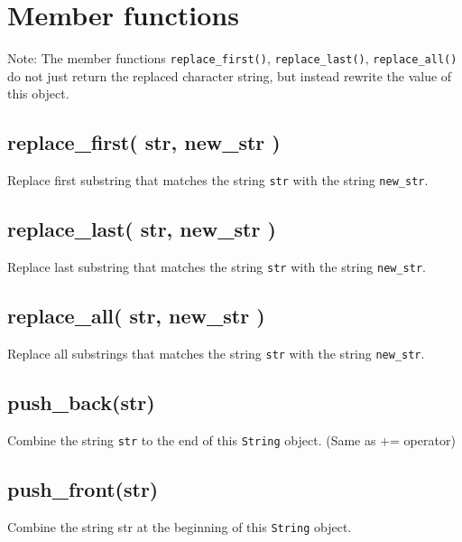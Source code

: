 \documentclass[
]{book}
\begin{document}
\hypertarget{member-functions}{%
\section{Member functions}\label{member-functions}}

Note: The member functions \texttt{replace\_first()}, \texttt{replace\_last()}, \texttt{replace\_all()} do not just return the replaced character string, but instead rewrite the value of this object.

\hypertarget{replace_first-str-new_str}{%
\subsection{replace\_first( str, new\_str )}\label{replace_first-str-new_str}}

Replace first substring that matches the string \texttt{str} with the string \texttt{new\_str}.

\hypertarget{replace_last-str-new_str}{%
\subsection{replace\_last( str, new\_str )}\label{replace_last-str-new_str}}

Replace last substring that matches the string \texttt{str} with the string \texttt{new\_str}.

\hypertarget{replace_all-str-new_str}{%
\subsection{replace\_all( str, new\_str )}\label{replace_all-str-new_str}}

Replace all substrings that matches the string \texttt{str} with the string \texttt{new\_str}.

\hypertarget{push_backstr}{%
\subsection{push\_back(str)}\label{push_backstr}}

Combine the string \texttt{str} to the end of this \texttt{String} object. (Same as += operator)

\hypertarget{push_frontstr}{%
\subsection{push\_front(str)}\label{push_frontstr}}

Combine the string str at the beginning of this \texttt{String} object.
\end{document}
